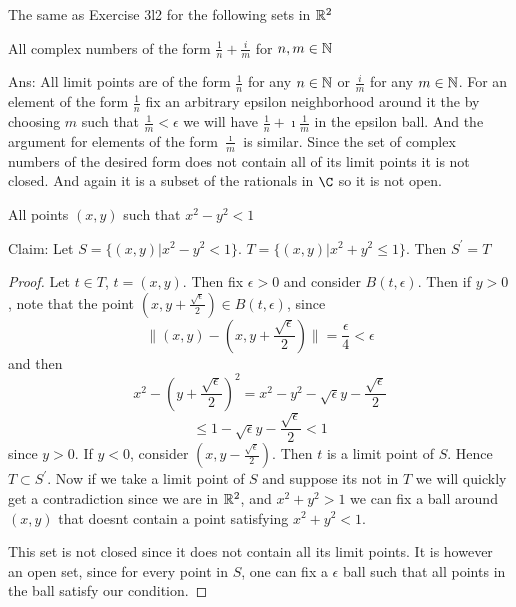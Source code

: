     \question 
    The same as Exercise 3l2 for the following sets in $\mathbb{R}^2$ 

    \begin{alphaparts}
        \questionpart 
        All complex numbers of the form $\frac{1}{n} + \frac{i}{m}$ for $n, m \in \mathbb{N}$ 

        Ans: 
        All limit points are of the form $\frac{1}{n}$ for any $n \in \mathbb{N}$ or $\frac{i}{m}$ for any $m \in \mathbb{N}$. 
        For an element of the form $\frac{1}{n}$ fix an arbitrary epsilon neighborhood around it the by choosing $m$ such that 
        $\frac{1}{m} < \epsilon$ we will have $\frac{1}{n} + \imath \frac{1}{m}$ in the epsilon ball. And the argument for 
        elements of the form $\frac{\imath}{m}$ is similar. Since the set of complex numbers of the desired form does not contain all of 
        its limit points it is not closed. And again it is a subset of the rationals in $\C$ so it is not open. 
        
        \questionpart
        All points $(x, y) $ such that $x^2 - y^2 < 1$ 

        Claim: Let $S = \{(x, y) | x^2 - y^2 < 1\}$. 
         $T = \{(x, y) | x^2 + y^2 \leq 1\}$.
         Then $S^\prime = T$


         \begin{proof}
            Let $t \in T$, $t = (x, y)$. Then fix $\epsilon > 0$ and consider $B(t, \epsilon)$. 
            Then if $y > 0$, note that the point $(x, y + \frac{\sqrt{\epsilon}}{2}) \in B(t, \epsilon)$, 
            since 
            \[ \| (x, y) - (x, y + \frac{\sqrt{\epsilon}}{2}) \| = \frac{\epsilon}{4} < \epsilon \]
            and then 
            \[x^2 - (y + \frac{\sqrt{\epsilon}}{2})^2 = x^2 - y^2 - \sqrt{\epsilon}y - \frac{\sqrt{\epsilon}}{2}\]
            \[\leq 1 - \sqrt{\epsilon}y - \frac{\sqrt{\epsilon}}{2} < 1\]
            since $y > 0$. If $y < 0$, consider $(x, y - \frac{\sqrt{\epsilon}}{2})$. 
            Then $t$ is a limit point of $S$. Hence $T \subset S^\prime$. 
            Now if we take a limit point of $S$ and suppose its not in $T$ we will quickly get a contradiction 
            since we are in $\mathbb{R}^2$, and $x^2 + y^2 > 1$ we can fix a ball around $(x, y)$ that doesnt contain a point 
            satisfying $x^2 + y^2 < 1$. 

            This set is not closed since it does not contain all its limit points. It is however an open set, 
            since for every point in $S$, one can fix a $\epsilon$ ball such that all points in the ball satisfy our condition. 


\end{proof}
\end{alphaparts}
